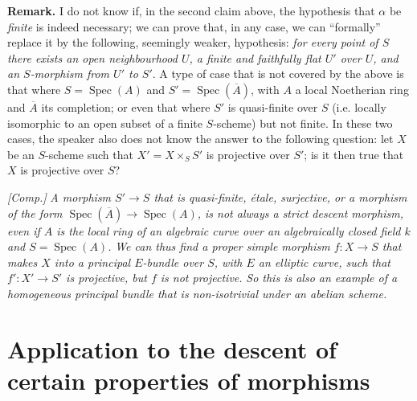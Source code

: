 \documentclass{article}
\newenvironment{rmenv}[1]
  {\phantomsection\par\medskip\noindent\textbf{#1.}\rmfamily}
  {\medskip}
\DeclareMathOperator{\Spec}{Spec}
\begin{document}
\begin{rmenv}{Remark}
  I do not know if, in the second claim above, the hypothesis that $\alpha$ be \emph{finite} is indeed necessary;
  we can prove that, in any case, we can ``formally'' replace it by the following, seemingly weaker, hypothesis:
  \emph{for every point of $S$ there exists an open neighbourhood $U$, a finite and faithfully flat $U'$ over $U$, and an $S$-morphism from $U'$ to $S'$}.
  A type of case that is not covered by the above is that where $S=\Spec(A)$ and $S'=\Spec(\overline{A})$, with $A$ a local Noetherian ring and $\overline{A}$ its completion;
  or even that where $S'$ is quasi-finite over $S$ (i.e. locally isomorphic to an open subset of a finite $S$-scheme) but not finite.
  In these two cases, the speaker also does not know the answer to the following question:
  let $X$ be an $S$-scheme such that $X'=X\times_S S'$ is projective over $S'$;
  is it then true that $X$ is projective over $S$?

  \emph{[Comp.]}
  \emph{A morphism $S'\to S$ that is quasi-finite, \'{e}tale, surjective, or a morphism of the form $\Spec(\overline{A})\to\Spec(A)$, is not always a strict descent morphism, even if $A$ is the local ring of an algebraic curve over an algebraically closed field $k$ and $S=\Spec(A)$.}
  \emph{We can thus find a proper simple morphism $f\colon X\to S$ that makes $X$ into a principal $E$-bundle over $S$, with $E$ an elliptic curve, such that $f'\colon X'\to S'$ is projective, but $f$ is not projective.}
  \emph{So this is also an example of a homogeneous principal bundle that is \emph{non-isotrivial} under an abelian scheme.}
\end{rmenv}


\section{Application to the descent of certain properties of morphisms}
\label{B.2}
\end{document}
